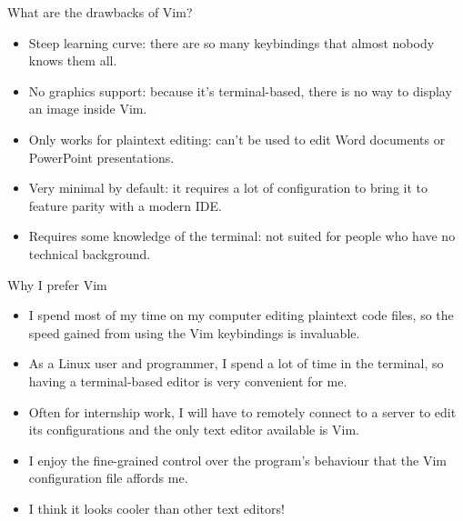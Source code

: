 \documentclass[]{beamer}
\begin{document}
\begin{frame}{What are the drawbacks of Vim?}
    \begin{itemize}
        \item   Steep learning curve: there are so many keybindings that almost nobody knows them all.
        \item   No graphics support: because it's terminal-based, there is no way to display an image inside Vim.
        \item   Only works for plaintext editing: can't be used to edit Word documents or PowerPoint presentations.
        \item   Very minimal by default: it requires a lot of configuration to bring it to feature parity with a modern 
                IDE.
        \item   Requires some knowledge of the terminal: not suited for people who have no technical background.
    \end{itemize}
\end{frame}

\begin{frame}{Why I prefer Vim}
    \begin{itemize}
        \item   I spend most of my time on my computer editing plaintext code files, so the speed gained from using the 
                Vim keybindings is invaluable.
        \item   As a Linux user and programmer, I spend a lot of time in the terminal, so having a terminal-based editor 
                is very convenient for me.
        \item   Often for internship work, I will have to remotely connect to a server to edit its configurations and
                the only text editor available is Vim.
        \item   I enjoy the fine-grained control over the program's behaviour that the Vim configuration file affords
                me.
        \item   I think it looks cooler than other text editors!
    \end{itemize}
\end{frame}
\end{document}
